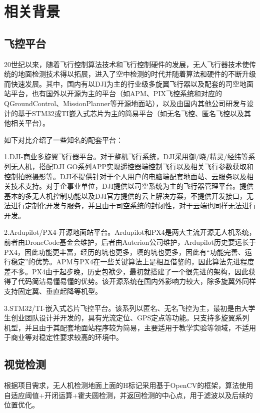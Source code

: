 \chapter{相关背景}
\section{飞控平台}

20世纪以来，随着飞行控制算法技术和飞行控制硬件的发展，无人飞行器技术使传统的地面检测技术得以拓展，进入了空中检测的时代并随着算法和硬件的不断升级而快速发展。其中，国内有以DJI为主的行业级多旋翼飞行器以及配套的司空地面站平台，也有国外以开源为主的平台（如APM、PIX飞控系统和对应的QGroundControl、MissionPlanner等开源地面站），以及由国内其他公司研发与设计的基于STM32或TI嵌入式芯片为主的简易平台（如无名飞控、匿名飞控以及其他相关平台）。

如下对比介绍了一些知名的配套平台：

1.DJI-商业多旋翼飞行器平台。对于整机飞行系统，DJI采用御/晓/精灵/经纬等系列无人机，搭配DJI GO系列APP实现遥控器端控制飞行以及相关飞行参数获取和控制拍照摄影等。DJI不提供针对于个人用户的电脑端配套地面站、云服务以及相关技术支持。对于企事业单位，DJI提供以司空系统为主的飞行器管理平台。提供基本的多无人机控制功能以及DJI官方提供的云上解决方案，不提供开发接口，无法进行定制化开发与服务，并且由于司空系统的封闭性，对于云端也同样无法进行开发。

2.Ardupilot/PX4-开源地面站平台。Ardupilot和PX4是两大主流开源无人机系统，前者由DroneCode基金会维护，后者由Auterion公司维护，Ardupilot历史要远长于PX4，因此功能更丰富，经历的坑也更多，填的坑也更多，因此有“功能完善、运行稳定”的优势。APM与PX4在一些关键算法上是相互借鉴的，因此算法先进程度差不多。PX4由于起步晚，历史包袱少，最初就搭建了一个很先进的架构，因此获得了代码简洁易懂易懂的优势。该开源系统在国内外影响力较大，除多旋翼外同样支持固定翼、垂直起降等机型。

3.STM32/TI-嵌入式芯片飞控平台。该系列以匿名、无名飞控为主，最初是由大学生创业团队设计并开发的，具有光流定位、GPS定点等功能。只支持多旋翼系列机型，并且由于其配套地面站程序较为简易，主要适用于教学实验等领域，不适用于商业等对稳定性要求较高的环境中。

\section{视觉检测}

根据项目需求，无人机检测地面上面的H标记采用基于OpenCV的框架，算法使用自适应阈值+开闭运算+霍夫圆检测，并返回检测的中心点，用于滤波以及后续的位置优化。

